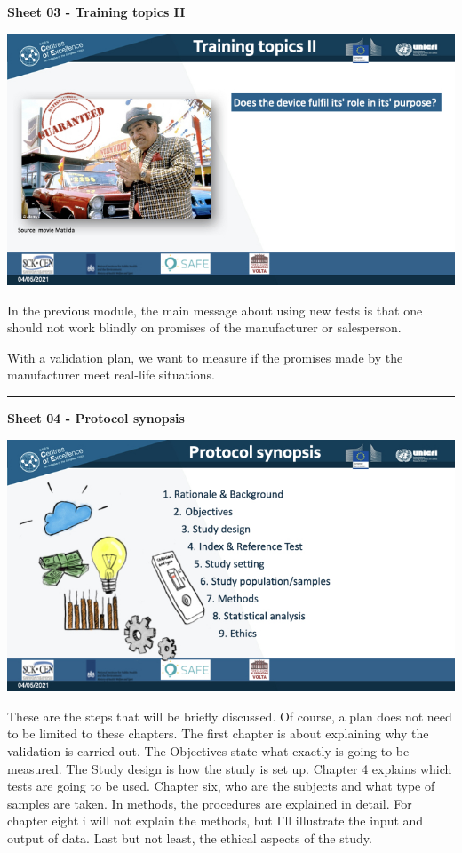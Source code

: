 \documentclass[
]{book}
\newcommand{\RL}[1]{\beginR #1\endR}
\begin{document}
\textbf{Sheet 03 - Training topics II}

\includegraphics{images/m03/m03_validation_of_test_kits_v2_2.003.jpeg}

In the previous module, the main message about using new tests is that
one should not work blindly on promises of the manufacturer or
salesperson.

With a validation plan, we want to measure if the promises made by the
manufacturer meet real-life situations.

\begin{center}\rule{0.5\linewidth}{0.5pt}\end{center}

\textbf{Sheet 04 - Protocol synopsis}

\includegraphics{images/m03/m03_validation_of_test_kits_v2_2.004.jpeg}

These are the steps that will be briefly discussed. Of course, a plan
does not need to be limited to these chapters. The first chapter is
about explaining why the validation is carried out. The Objectives state
what exactly is going to be measured. The Study design is how the study
is set up. Chapter 4 explains which tests are going to be used. Chapter
six, who are the subjects and what type of samples are taken. In
methods, the procedures are explained in detail. For chapter eight i
will not explain the methods, but I\RL{'}ll illustrate the input
and output of data. Last but not least, the ethical aspects of the
study.
\end{document}
